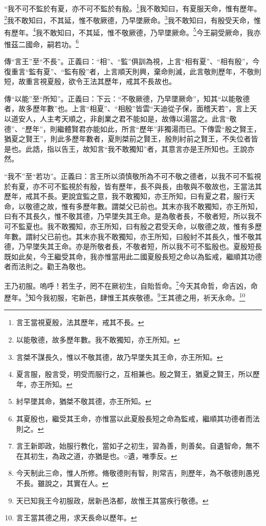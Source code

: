 “我不可不監於有夏，亦不可不監於有殷。\footnote{言王當視夏殷，法其歷年，戒其不長。}我不敢知曰，有夏服天命，惟有歷年。\footnote{以能敬德，故多歷年數。我不敢獨知，亦王所知。}我不敢知曰，不其延，惟不敬厥德，乃早墜厥命。\footnote{言桀不謀長久，惟以不敬其德，故乃早墜失其王命，亦王所知。}我不敢知曰，有殷受天命，惟有歷年。\footnote{夏言服，殷言受，明受而服行之，互相兼也。殷之賢王，猶夏之賢王，所以歷年，亦王所知。}我不敢知曰，不其延，惟不敬厥德，乃早墜厥命。\footnote{紂早墜其命，猶桀不敬其德，亦王所知。}今王嗣受厥命，我亦惟茲二國命，嗣若功。\footnote{其夏殷也，繼受其王命，亦惟當以此夏殷長短之命為監戒，繼順其功德者而法則之。}


{\noindent\zhuan{}\fzbyks 傳“言王”至“不長”。正義曰：“相”、“監”俱訓為視，上言“相有夏”、“相有殷”，今復重言“監有夏”、“監有殷”者，上言順天則興，棄命則滅，此言敬則歷年，不敬則短，故重言視夏殷，欲令王法其歷年，戒其不長故也。 \par}

{\noindent\zhuan{}\fzbyks 傳“以能”至“所知”。正義曰：下云：“不敬厥德，乃早墜厥命”，知其“以能敬德者，故多歷年數”也。上言“相夏”、“相殷”皆雲“天迪從子保，面稽天若”，言上天以道安人，人主考天順之，非創業之君不能如是，故傳以湯當之。此言“敬德”、“歷年”，則繼體賢君亦能如此，所言“歷年”非獨湯而已。下傳雲“殷之賢王，猶夏之賢王”，則此多歷年數者，夏則桀前之賢王，殷則紂前之賢王，不失位者皆是也。此誥，指以告王，故知言“我不敢獨知”者，其意言亦是王所知也。王說亦然。 \par}

{\noindent\shu{}\fzkt “我不”至“若功”。正義曰：言王所以須慎敬所為不可不敬之德者，以我不可不監視於有夏，亦不可不監視於有殷，皆有歷年，長不與長，由敬與不敬故也，王當法其歷年，戒其不長。更說宜監之意，我不敢獨知，亦王所知，曰有夏之君，服行天命，以敬德之故，惟有多歷年數。謂桀父已前也。其末亦我不敢獨知，亦王所知，曰有不其長久，惟不敬其德，乃早墜失其王命。是為敬者長，不敬者短，所以我不可不監夏也。我不敢獨知，亦王所知，曰有殷之君受天命，以敬德之故，惟有多歷年數。謂紂父已前也。其末亦我不敢獨知，亦王所知，曰殷紂不其長久，惟不敬其德，乃早墜失其王命。亦是所敬者長，不敬者短，所以我不可不監殷也。夏殷短長既如此矣，今王繼受其命，我亦惟當用此二國夏殷長短之命以為監戒，繼順其功德者而法則之。勸王為敬也。 \par}

王乃初服。嗚呼！若生子，罔不在厥初生，自貽哲命。\footnote{言王新即政，始服行教化，當如子之初生，習為善，則善矣。自遺智命，無不在其初生，為政之道，亦猶是也。○遺，唯季反。}今天其命哲，命吉凶，命歷年。\footnote{今天制此三命，惟人所修。脩敬德則有智，則常吉，則歷年，為不敬德則愚兇不長。雖說之，其實在人。}知今我初服，宅新邑，肆惟王其疾敬德。\footnote{天已知我王今初服政，居新邑洛都，故惟王其當疾行敬德。}王其德之用，祈天永命。\footnote{言王當其德之用，求天長命以歷年。}



